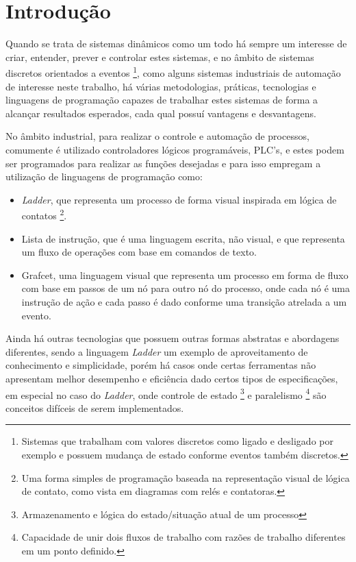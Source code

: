 \chapter{Introdução}

Quando se trata de sistemas dinâmicos como um todo há sempre um interesse de criar, entender, prever e controlar estes sistemas, e no âmbito de sistemas discretos orientados a eventos \footnote{Sistemas que trabalham com valores discretos como ligado e desligado por exemplo e possuem mudança de estado conforme eventos também discretos.}, como alguns sistemas industriais de automação de interesse neste trabalho, há várias metodologias, práticas, tecnologias e linguagens de programação capazes de trabalhar estes sistemas de forma a alcançar resultados esperados, cada qual possuí vantagens e desvantagens.

No âmbito industrial, para realizar o controle e automação de processos, comumente é utilizado controladores lógicos programáveis, PLC's, e estes podem ser programados para realizar as funções desejadas e para isso empregam a utilização de linguagens de programação como: 

\begin{itemize}
	\item \textit{Ladder}, que representa um processo de forma visual inspirada em lógica de contatos \footnote{Uma forma simples de programação baseada na representação visual de lógica de contato, como vista em diagramas com relés e contatoras.}.
	\item Lista de instrução, que é uma linguagem escrita, não visual, e que representa um fluxo de operações com base em comandos de texto.
	\item Grafcet, uma linguagem visual que representa um processo em forma de fluxo com base em passos de um nó para outro nó do processo, onde cada nó é uma instrução de ação e cada passo é dado conforme uma transição atrelada a um evento. 
\end{itemize}

Ainda há outras tecnologias que possuem outras formas abstratas e abordagens diferentes, sendo a linguagem \textit{Ladder} um exemplo de aproveitamento de conhecimento e simplicidade, porém há casos onde certas ferramentas não apresentam melhor desempenho e eficiência dado certos tipos de especificações, em especial no caso do \textit{Ladder}, onde controle de estado \footnote{Armazenamento e lógica do estado/situação atual de um processo} e paralelismo \footnote{Capacidade de unir dois fluxos de trabalho com razões de trabalho diferentes em um ponto definido.} são conceitos difíceis de serem implementados. 

